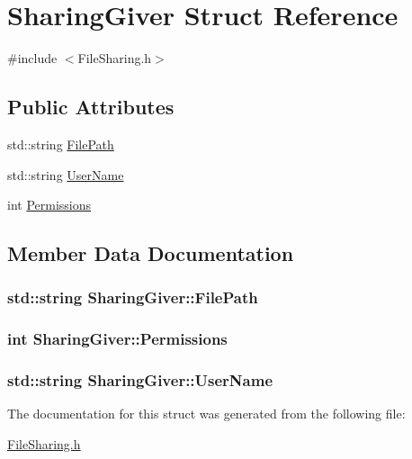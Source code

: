 \hypertarget{structSharingGiver}{\section{Sharing\-Giver Struct Reference}
\label{structSharingGiver}
}


{\ttfamily \#include $<$File\-Sharing.\-h$>$}

\subsection*{Public Attributes}
\begin{DoxyCompactItemize}
\item 
std\-::string \hyperlink{structSharingGiver_afc22907e01714c49abf53de51119a7f9}{File\-Path}
\item 
std\-::string \hyperlink{structSharingGiver_a3bb585c4f916f494c5e14fe1511e7f6d}{User\-Name}
\item 
int \hyperlink{structSharingGiver_a1092b78b71d8a6881a6a83db1305abc7}{Permissions}
\end{DoxyCompactItemize}


\subsection{Member Data Documentation}
\hypertarget{structSharingGiver_afc22907e01714c49abf53de51119a7f9}{
\subsubsection[{File\-Path}]{\setlength{\rightskip}{0pt plus 5cm}std\-::string Sharing\-Giver\-::\-File\-Path}}\label{structSharingGiver_afc22907e01714c49abf53de51119a7f9}
\hypertarget{structSharingGiver_a1092b78b71d8a6881a6a83db1305abc7}{
\subsubsection[{Permissions}]{\setlength{\rightskip}{0pt plus 5cm}int Sharing\-Giver\-::\-Permissions}}\label{structSharingGiver_a1092b78b71d8a6881a6a83db1305abc7}
\hypertarget{structSharingGiver_a3bb585c4f916f494c5e14fe1511e7f6d}{
\subsubsection[{User\-Name}]{\setlength{\rightskip}{0pt plus 5cm}std\-::string Sharing\-Giver\-::\-User\-Name}}\label{structSharingGiver_a3bb585c4f916f494c5e14fe1511e7f6d}


The documentation for this struct was generated from the following file\-:\begin{DoxyCompactItemize}
\item 
\hyperlink{FileSharing_8h}{File\-Sharing.\-h}\end{DoxyCompactItemize}
